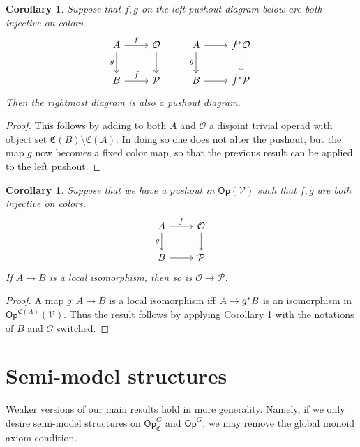 \documentclass[a4paper,10pt
,draft
]{article}%
\numberwithin{equation}{section}
\numberwithin{figure}{section}
\newtheorem{corollary}[equation]{Corollary}%
\theoremstyle{definition} %
\newcommand{\Op}{\mathsf{Op}}%
\newcommand{\V}{\ensuremath{\mathcal V}}
\renewcommand{\O}{\ensuremath{\mathcal O}}
\renewcommand{\P}{\ensuremath{\mathcal P}}
\newcommand{\1}{\ensuremath{\mathbbm 1}}%
\begin{document}
\begin{corollary}\label{FGTPUSH COR}
Suppose that $f,g$ on the left pushout diagram below are both injective on colors.
\[
\begin{tikzcd}
	A \ar{r}{f} \ar{d}[swap]{g} & \mathcal{O} \ar{d}
&
	A \ar{r} \ar{d}[swap]{g} & f^{\**} \mathcal{O} \ar{d}
\\
	B \ar{r}{\tilde{f}} & \mathcal{P}
&
	B \ar{r} & \tilde{f}^{\**} \mathcal{P}
\end{tikzcd}
\]
Then the rightmost diagram is also a pushout diagram.
\end{corollary}

\begin{proof}
This follows by adding to both $A$ and $\mathcal{O}$ a disjoint trivial operad with object set $\mathfrak{C}(B) \setminus \mathfrak{C}(A)$. In doing so one does not alter the pushout, but the map $g$ now becomes a fixed color map, so that the previous result can be applied to the left pushout.
\end{proof}


\begin{corollary}
      \label{LOCALISO_COR}
      Suppose that we have a pushout in $\Op(\V)$ such that $f,g$ are both injective on colors.
      \[
            \begin{tikzcd}
                  A \arrow[d, "g"'] \arrow[r, "f"]
                  &
                  \O \arrow[d]
                  \\
                  B \arrow[r]
                  &
                  \P
            \end{tikzcd}
      \]
      If $A \to B$ is a local isomorphism, then so is $\O \to \P$.
\end{corollary}
\begin{proof}
      A map $g: A \to B$ is a local isomorphism iff $A \to g^{\**}B$ is an isomorphism in $\Op^{\mathfrak C(A)}(\V)$.
      Thus the result follows by applying Corollary \ref{FGTPUSH COR} with the notations of $B$ and $\O$ switched.      
\end{proof}







\section{Semi-model structures}

Weaker versions of our main results hold in more generality.
Namely, if we only desire semi-model structures on $\Op^G_{\mathfrak C}$ and $\Op^G$, we may
remove the global monoid axiom condition.
\end{document}
